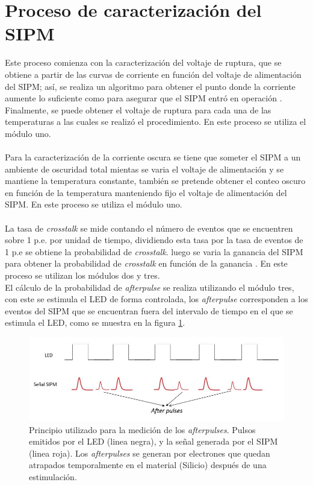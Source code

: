 \documentclass[11pt,letterpaper,oneside]{book}
\begin{document}
	 \section{\textbf{Proceso de caracterización del SIPM}}
Este proceso comienza con la caracterización del voltaje de ruptura, que se obtiene a partir de las curvas de corriente en función del voltaje de alimentación del SIPM; así, se realiza un algoritmo para obtener el punto donde la corriente aumente lo suficiente como para asegurar que el SIPM entró en operación \cite{Muon_counting_Amiga}. Finalmente, se puede obtener el voltaje de ruptura para cada una de las temperaturas a las cuales se realizó el procedimiento. En este proceso se utiliza el módulo uno.\\ \\     
Para la caracterización de la corriente oscura se tiene que someter el SIPM a un ambiente de oscuridad total mientas se varia el voltaje de alimentación y se mantiene la temperatura constante, también se pretende obtener el conteo oscuro en función de la temperatura  manteniendo fijo el voltaje de alimentación del SIPM. En este proceso se utiliza el módulo uno.\\ \\ 
La tasa de \textit{crosstalk} se mide contando el número de eventos que se encuentren sobre 1 p.e. por unidad de tiempo, dividiendo esta tasa por la tasa de eventos de 1 p.e se obtiene la probabilidad de \textit{crosstalk}. luego se varia la ganancia del SIPM para obtener la probabilidad de \textit{crosstalk} en función de la ganancia \cite{Measuring_ectr_opti_SIPM_hamamatsu}. En este proceso se utilizan los módulos dos y tres.\\

El cálculo de la probabilidad de \textit{afterpulse} se realiza utilizando el módulo tres, con este se estimula el LED de forma controlada, los \textit{afterpulse} corresponden a los eventos del SIPM que se encuentran fuera del intervalo de tiempo en el que se estimula el LED, como se muestra en la figura \ref{afterpulse}.\\  
\begin{figure}[ht]
  \centering
  \includegraphics[width=\columnwidth]{Afterpulses}
  \caption{Principio utilizado para la medición de los \textit{afterpulses}. Pulsos emitidos por el LED (linea negra), y la señal generada por el SIPM (linea roja). Los \textit{afterpulses} se generan por electrones que quedan atrapados temporalmente en el material (Silicio) después de una estimulación.}
\label{afterpulse}
\end{figure}
\end{document}
